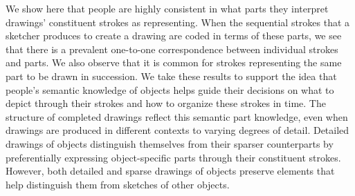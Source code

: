 \documentclass[10pt,letterpaper]{article}
\begin{document}










We show here that people are highly consistent in what parts they interpret drawings' constituent strokes as representing. 
When the sequential strokes that a sketcher produces to create a drawing are coded in terms of these parts, we see that there is a prevalent one-to-one correspondence between individual strokes and parts. 
We also observe that it is common for strokes representing the same part to be drawn in succession.
We take these results to support the idea that people's semantic knowledge of objects helps guide their decisions on what to depict through their strokes and how to organize these strokes in time.
The structure of completed drawings reflect this semantic part knowledge, even when drawings are produced in different contexts to varying degrees of detail. Detailed drawings of objects distinguish themselves from their sparser counterparts by preferentially expressing object-specific parts through their constituent strokes. However, both detailed and sparse drawings of objects preserve elements that help distinguish them from sketches of other objects.
\end{document}
